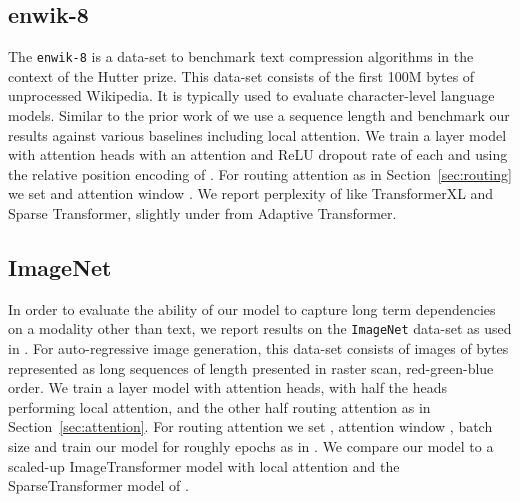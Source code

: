 \documentclass[a4paper]{article}
\begin{document}
\subsection{enwik-8}
The \texttt{enwik-8} \citep{mahoney2011large}
is a data-set to benchmark text compression 
algorithms in the context of the Hutter prize. This data-set
consists of the first 100M bytes of unprocessed Wikipedia.
It is typically used to evaluate character-level language models.
Similar to the prior work of \citet{dai2019transformer, child2019generating}
we use a sequence length  and benchmark our results
against various baselines including local attention.
We train a  layer model with  attention heads with an
attention and ReLU dropout rate of  each and using the relative
position encoding of \citet{shaw2018self}. For routing
attention as in Section~\ref{sec:routing} we set  
and attention window . We report perplexity of  like 
TransformerXL and Sparse Transformer, slightly under  from 
Adaptive Transformer. 

\subsection{ImageNet }
In order to evaluate the ability of our model to capture long term
dependencies on a modality other than text, we report results on
the \texttt{ImageNet}  data-set as used in \citet{child2019generating}.
For auto-regressive image generation, this data-set consists of images of 
 bytes represented as long sequences of length  
presented in raster scan, red-green-blue order.
We train a  layer model with  attention heads, with half
the heads performing local attention, and the other half routing
attention as in Section~\ref{sec:attention}. For routing attention
we set , attention window , batch size  
and train our model for roughly  epochs as in 
\citet{child2019generating}. We compare
our model to a scaled-up ImageTransformer model with local attention \citep{parmar2018image}
and the SparseTransformer model of \citet{child2019generating}.
\end{document}
